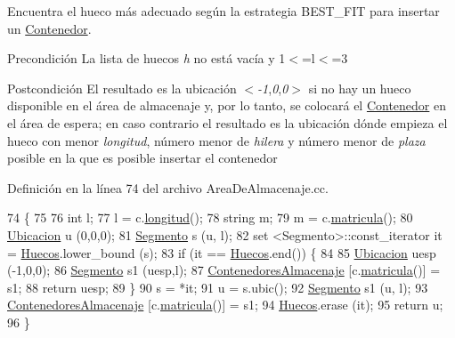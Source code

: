 Encuentra el hueco más adecuado según la estrategia B\+E\+S\+T\+\_\+\+F\+IT para insertar un \hyperlink{class_contenedor}{Contenedor}. 

\begin{DoxyPrecond}{Precondición}
La lista de huecos {\itshape h} no está vacía y 1$<$=l$<$=3 
\end{DoxyPrecond}
\begin{DoxyPostcond}{Postcondición}
El resultado es la ubicación $<${\itshape -\/1},{\itshape 0},{\itshape 0}$>$ si no hay un hueco disponible en el área de almacenaje y, por lo tanto, se colocará el \hyperlink{class_contenedor}{Contenedor} en el área de espera; en caso contrario el resultado es la ubicación dónde empieza el hueco con menor {\itshape longitud}, número menor de {\itshape hilera} y número menor de {\itshape plaza} posible en la que es posible insertar el contenedor 
\end{DoxyPostcond}


Definición en la línea 74 del archivo Area\+De\+Almacenaje.\+cc.


\begin{DoxyCode}
74                                                              \{
75     
76     \textcolor{keywordtype}{int} l;
77     l = c.\hyperlink{class_contenedor_a203894805dd0b8347f9884990dab0d9d}{longitud}();
78     \textcolor{keywordtype}{string} m;
79     m = c.\hyperlink{class_contenedor_aac5839c94f8d3be8a908740a1af0b716}{matricula}();
80     \hyperlink{class_ubicacion}{Ubicacion} u (0,0,0);
81     \hyperlink{class_segmento}{Segmento} s (u, l);
82     set <Segmento>::const\_iterator it = \hyperlink{class_almacenaje_ac7f1f8559babe3ac7841bb7f9e50d79a}{Huecos}.lower\_bound (s);
83     \textcolor{keywordflow}{if} (it == \hyperlink{class_almacenaje_ac7f1f8559babe3ac7841bb7f9e50d79a}{Huecos}.end()) \{
84         
85         \hyperlink{class_ubicacion}{Ubicacion} uesp (-1,0,0);
86         \hyperlink{class_segmento}{Segmento} s1 (uesp,l);
87         \hyperlink{class_almacenaje_ab3cfe0feaf244094a7e2c5225ee681e6}{ContenedoresAlmacenaje} [c.\hyperlink{class_contenedor_aac5839c94f8d3be8a908740a1af0b716}{matricula}()] = s1;
88         \textcolor{keywordflow}{return} uesp;
89     \}
90     s = *it;
91     u = s.ubic();
92     \hyperlink{class_segmento}{Segmento} s1 (u, l);
93     \hyperlink{class_almacenaje_ab3cfe0feaf244094a7e2c5225ee681e6}{ContenedoresAlmacenaje} [c.\hyperlink{class_contenedor_aac5839c94f8d3be8a908740a1af0b716}{matricula}()] = s1;
94     \hyperlink{class_almacenaje_ac7f1f8559babe3ac7841bb7f9e50d79a}{Huecos}.erase (it);
95     \textcolor{keywordflow}{return} u;
96 \}
\end{DoxyCode}
\mbox{\label{class_almacenaje_aa846d1cf215bd139527d2607d4cee833}} 
